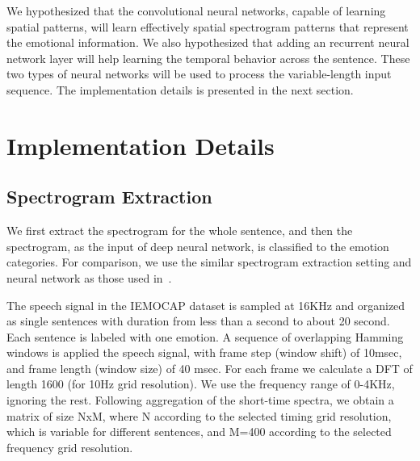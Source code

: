 \documentclass[a4paper]{article}
\begin{document}
We hypothesized that the convolutional neural networks, capable of learning spatial patterns, will learn effectively spatial spectrogram patterns that represent the emotional information. We also hypothesized that adding an recurrent neural network layer will help learning the temporal behavior across the sentence. These two types of neural networks will be used to process the variable-length input sequence. The implementation details is presented in the next section.  

\section{Implementation Details}
\label{sec:implementation_details}

\subsection{Spectrogram Extraction}
\label{ssec:spectrogram_extraction}

We first extract the spectrogram for the whole sentence, and then the spectrogram, as the input of deep neural network, is classified to the emotion categories. For comparison, we use the similar spectrogram extraction setting and neural network as those used in~\cite{satt2017}.



The speech signal in the IEMOCAP dataset is sampled at 16KHz and organized as single sentences with duration from less than a second to about 20 second. Each sentence is labeled with one emotion. A sequence of overlapping Hamming windows is applied the speech signal, with frame step (window shift) of 10msec, and frame length (window size) of 40 msec. For each frame we calculate a DFT of length 1600 (for 10Hz grid resolution). We use the frequency range of 0-4KHz, ignoring the rest. Following aggregation of the short-time spectra, we obtain a matrix of size NxM, where N according to the selected timing grid resolution, which is variable for different sentences,  and M=400 according to the selected frequency grid resolution.
\end{document}
